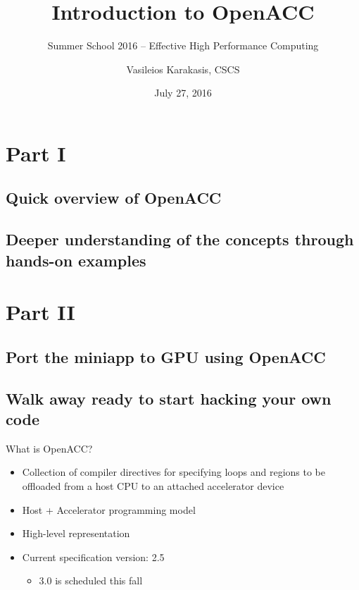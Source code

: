 \documentclass[12pt,aspectratio=169]{beamer}
\author{Vasileios Karakasis, CSCS}
\title{Introduction to OpenACC}
\subtitle{Summer School 2016 -- Effective High Performance Computing}
\date{July 27, 2016}
\begin{document}
\cscstitle


\section{Part I}
\subsection{Quick overview of OpenACC}
\subsection{Deeper understanding of the concepts through hands-on examples}

\section{Part II}
\subsection{Port the miniapp to GPU using OpenACC}
\subsection{Walk away ready to start hacking your own code}

\begin{frame}{What is OpenACC?}
  \begin{itemize}
  \item Collection of compiler directives for specifying loops and regions to be
    offloaded from a host CPU to an attached accelerator device
  \item Host + Accelerator programming model
  \item High-level representation
  \item Current specification version: 2.5
    \begin{itemize}
    \item 3.0 is scheduled this fall
    \end{itemize}
  \end{itemize}
\end{frame}
\end{document}
